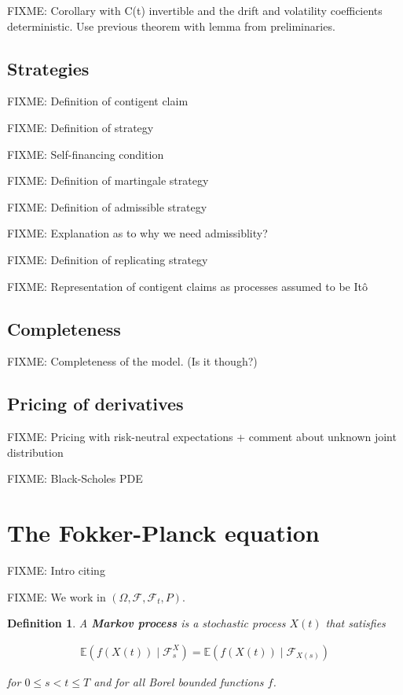 \documentclass[a4paper]{article}
\newtheorem{definition}{Definition}[section]
\begin{document}
FIXME: Corollary with C(t) invertible and the drift and volatility coefficients deterministic. Use previous theorem with lemma from preliminaries.

\subsection{Strategies}

FIXME: Definition of contigent claim

FIXME: Definition of strategy

FIXME: Self-financing condition

FIXME: Definition of martingale strategy

FIXME: Definition of admissible strategy

FIXME: Explanation as to why we need admissiblity?

FIXME: Definition of replicating strategy

FIXME: Representation of contigent claims as processes assumed to be It\^o

\subsection{Completeness}

FIXME: Completeness of the model. (Is it though?)

\subsection{Pricing of derivatives}

FIXME: Pricing with risk-neutral expectations + comment about unknown joint distribution

FIXME: Black-Scholes PDE

\pagebreak
\section{The Fokker-Planck equation}


FIXME: Intro citing \textcite{pavliotis_stochastic_2014}

FIXME: We work in $(\Omega, \mathcal{F}, \mathcal{F}_t, P)$.

\begin{definition}
  A \textbf{Markov process} is a stochastic process $X(t)$ that satisfies

  \begin{align*}
    \mathbb{E}(f(X(t)) \mid \mathcal{F}^X_{s})
    = \mathbb{E}(f(X(t)) \mid \mathcal{F}_{X(s)})
  \end{align*}

  for $0 \le s < t \le T$ and for all Borel bounded functions $f$.
\end{definition}
\end{document}
